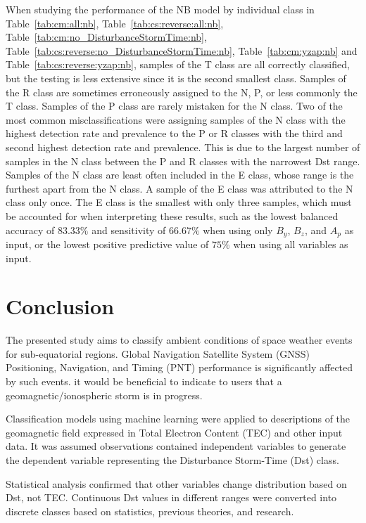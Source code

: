 \documentclass[sn-mathphys-num]{sn-jnl}%
\begin{document}
When studying the performance of the NB model by individual class in Table~\ref{tab:cm:all:nb}, Table~\ref{tab:cs:reverse:all:nb}, Table~\ref{tab:cm:no_DisturbanceStormTime:nb}, Table~\ref{tab:cs:reverse:no_DisturbanceStormTime:nb}, Table~\ref{tab:cm:yzap:nb} and Table~\ref{tab:cs:reverse:yzap:nb}, samples of the T class are all correctly classified, but the testing is less extensive since it is the second smallest class. Samples of the R class are sometimes erroneously assigned to the N, P, or less commonly the T class. Samples of the P class are rarely mistaken for the N class. Two of the most common misclassifications were assigning samples of the N class with the highest detection rate and prevalence to the P or R classes with the third and second highest detection rate and prevalence. This is due to the largest number of samples in the N class between the P and R classes with the narrowest Dst range. Samples of the N class are least often included in the E class, whose range is the furthest apart from the N class. A sample of the E class was attributed to the N class only once. The E class is the smallest with only three samples, which must be accounted for when interpreting these results, such as the lowest balanced accuracy of $83.33\%$ and sensitivity of $66.67\%$ when using only $B_{y}$, $B_{z}$, and $A_{p}$ as input, or the lowest positive predictive value of $75\%$ when using all variables as input.

\section{Conclusion}
\label{sec:Conclusion}

The presented study aims to classify ambient conditions of space weather events for sub-equatorial regions. Global Navigation Satellite System (GNSS) Positioning, Navigation, and Timing (PNT) performance is significantly affected by such events. it would be beneficial to indicate to users that a geomagnetic/ionospheric storm is in progress. 

Classification models using machine learning were applied to descriptions of the geomagnetic field expressed in Total Electron Content (TEC) and other input data. It was assumed observations contained independent variables to generate the dependent variable representing the Disturbance Storm-Time (Dst) class. 

Statistical analysis confirmed that other variables change distribution based on Dst, not TEC. Continuous Dst values in different ranges were converted into discrete classes based on statistics, previous theories, and research. 
\end{document}
